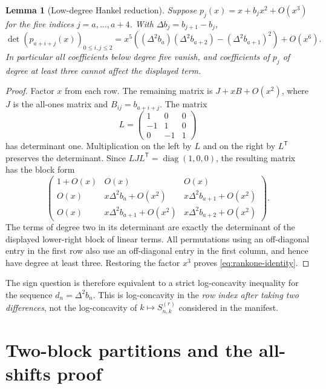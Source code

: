\documentclass[11pt,a4paper]{article}
\newtheorem{lemma}[theorem]{Lemma}
\theoremstyle{definition}
\numberwithin{equation}{section}
\begin{document}
\begin{lemma}[Low-degree Hankel reduction]
\label{lem:rankone}
Suppose $p_j(x)=x+b_jx^2+O(x^3)$ for the five indices
$j=a,\ldots,a+4$. With $\Delta b_j=b_{j+1}-b_j$,
\begin{equation}
 \det(p_{a+i+j}(x))_{0\le i,j\le2}
 =x^5\left((\Delta^2b_a)(\Delta^2b_{a+2})
                -(\Delta^2b_{a+1})^2\right)+O(x^6).
 \label{eq:rankone-identity}
\end{equation}
In particular all coefficients below degree five vanish, and coefficients
of $p_j$ of degree at least three cannot affect the displayed term.
\end{lemma}
\begin{proof}
Factor $x$ from each row. The remaining matrix is
$J+xB+O(x^2)$, where $J$ is the all-ones matrix and
$B_{ij}=b_{a+i+j}$. The matrix
\[
 L=\begin{pmatrix}1&0&0\\-1&1&0\\0&-1&1\end{pmatrix}
\]
has determinant one. Multiplication on the left by $L$ and on the right
by $L^{\mathsf T}$ preserves the determinant. Since
$LJL^{\mathsf T}=\operatorname{diag}(1,0,0)$, the resulting matrix has the
block form
\begin{equation}
 \begin{pmatrix}
  1+O(x)&O(x)&O(x)\\
  O(x)&x\Delta^2b_a+O(x^2)&x\Delta^2b_{a+1}+O(x^2)\\
  O(x)&x\Delta^2b_{a+1}+O(x^2)&x\Delta^2b_{a+2}+O(x^2)
 \end{pmatrix}.
 \label{eq:transformed}
\end{equation}
The terms of degree two in its determinant are exactly the determinant
of the displayed lower-right block of linear terms. All permutations
using an off-diagonal entry in the first row also use an off-diagonal
entry in the first column, and hence have degree at least three. Restoring
the factor $x^3$ proves \eqref{eq:rankone-identity}.
\end{proof}

The sign question is therefore equivalent to a strict log-concavity
inequality for the sequence $d_n=\Delta^2b_n$. This is log-concavity in the
\emph{row index after taking two differences}, not the log-concavity of
$k\mapsto S^{(r)}_{n,k}$ considered in the manifest.

\section{Two-block partitions and the all-shifts proof}
\label{sec:allshifts}
\end{document}
